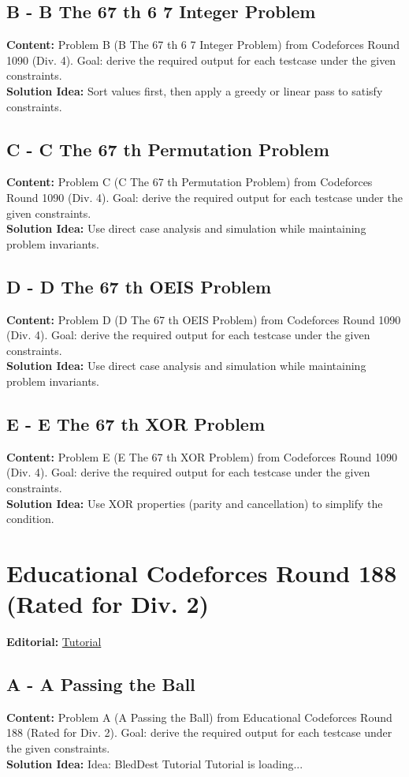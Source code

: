 \documentclass[11pt]{article}
\begin{document}
\subsection{B - B The 67 th 6 7 Integer Problem}
\textbf{Content:} Problem B (B The 67 th 6 7 Integer Problem) from Codeforces Round 1090 (Div. 4). Goal: derive the required output for each testcase under the given constraints.\\
\textbf{Solution Idea:} Sort values first, then apply a greedy or linear pass to satisfy constraints.

\subsection{C - C The 67 th Permutation Problem}
\textbf{Content:} Problem C (C The 67 th Permutation Problem) from Codeforces Round 1090 (Div. 4). Goal: derive the required output for each testcase under the given constraints.\\
\textbf{Solution Idea:} Use direct case analysis and simulation while maintaining problem invariants.

\subsection{D - D The 67 th OEIS Problem}
\textbf{Content:} Problem D (D The 67 th OEIS Problem) from Codeforces Round 1090 (Div. 4). Goal: derive the required output for each testcase under the given constraints.\\
\textbf{Solution Idea:} Use direct case analysis and simulation while maintaining problem invariants.

\subsection{E - E The 67 th XOR Problem}
\textbf{Content:} Problem E (E The 67 th XOR Problem) from Codeforces Round 1090 (Div. 4). Goal: derive the required output for each testcase under the given constraints.\\
\textbf{Solution Idea:} Use XOR properties (parity and cancellation) to simplify the condition.

\section{Educational Codeforces Round 188 (Rated for Div. 2)}
\textbf{Editorial:} \href{https://codeforces.com/blog/entry/152150}{Tutorial}

\subsection{A - A Passing the Ball}
\textbf{Content:} Problem A (A Passing the Ball) from Educational Codeforces Round 188 (Rated for Div. 2). Goal: derive the required output for each testcase under the given constraints.\\
\textbf{Solution Idea:} Idea: BledDest Tutorial Tutorial is loading...
\end{document}
